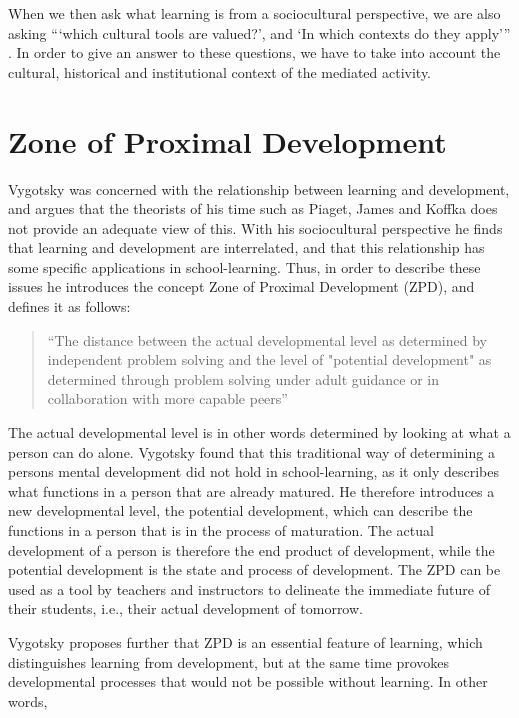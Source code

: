 When we then ask what learning is from a sociocultural perspective, we are also asking “‘which cultural tools are valued?’, and ‘In which contexts do they apply’” \citep{mifsud2010reconsidering}. In order to give an answer to these questions, we have to take into account the cultural, historical and institutional context of the mediated activity. 

\section{Zone of Proximal Development}
Vygotsky was concerned with the relationship between learning and development, and argues that the theorists of his time such as Piaget, James and Koffka does not provide an adequate view of this. With his sociocultural perspective he finds that learning and development are interrelated, and that this relationship has some specific applications in school-learning. \citep[p. 84]{vygotskiui1978mind} Thus, in order to describe these issues he introduces the concept Zone of Proximal Development (ZPD), and defines it as follows:

\begin{quote}“The distance between the actual developmental level as determined by independent problem solving and the level of "potential development" as determined through problem solving under adult guidance or in collaboration with more capable peers” \citep[p. 86]{vygotskiui1978mind}
\end{quote}

The actual developmental level is in other words determined by looking at what a person can do alone. Vygotsky found that this traditional way of determining a persons mental development did not hold in school-learning, as it only describes what functions in a person that are already matured. He therefore introduces a new developmental level, the potential development, which can describe the functions in a person that is in the process of maturation. The actual development of a person is therefore the end product of development, while the potential development is the state and process of development. The ZPD can be used as a tool by teachers and instructors to delineate the immediate future of their students, i.e., their actual development of tomorrow.

Vygotsky proposes further that ZPD is an essential feature of learning, which distinguishes learning from development, but at the same time provokes developmental processes that would not be possible without learning. In other words,

